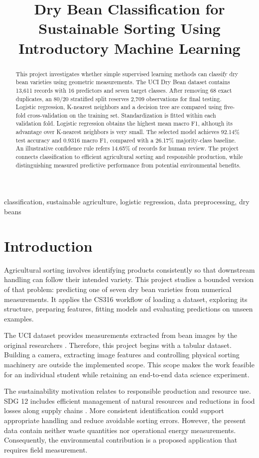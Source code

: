 \documentclass[conference]{IEEEtran}
\title{Dry Bean Classification for Sustainable Sorting Using Introductory Machine Learning}
\author{\IEEEauthorblockN{Abdulrahman Alfawaz}\IEEEauthorblockA{Prince Sultan University\\CS316: Introduction to AI and Data Science, Term 261}}
\begin{document}
\maketitle
\begin{abstract}
This project investigates whether simple supervised learning methods can classify dry bean varieties using geometric measurements. The UCI Dry Bean dataset contains 13,611 records with 16 predictors and seven target classes. After removing 68 exact duplicates, an 80/20 stratified split reserves 2,709 observations for final testing. Logistic regression, K-nearest neighbors and a decision tree are compared using five-fold cross-validation on the training set. Standardization is fitted within each validation fold. Logistic regression obtains the highest mean macro F1, although its advantage over K-nearest neighbors is very small. The selected model achieves 92.14\% test accuracy and 0.9316 macro F1, compared with a 26.17\% majority-class baseline. An illustrative confidence rule refers 14.65\% of records for human review. The project connects classification to efficient agricultural sorting and responsible production, while distinguishing measured predictive performance from potential environmental benefits.\end{abstract}
\begin{IEEEkeywords}classification, sustainable agriculture, logistic regression, data preprocessing, dry beans\end{IEEEkeywords}
\section{Introduction}
Agricultural sorting involves identifying products consistently so that downstream handling can follow their intended variety. This project studies a bounded version of that problem: predicting one of seven dry bean varieties from numerical measurements. It applies the CS316 workflow of loading a dataset, exploring its structure, preparing features, fitting models and evaluating predictions on unseen examples.

The UCI dataset provides measurements extracted from bean images by the original researchers \cite{uci}. Therefore, this project begins with a tabular dataset. Building a camera, extracting image features and controlling physical sorting machinery are outside the implemented scope. This scope makes the work feasible for an individual student while retaining an end-to-end data science experiment.

The sustainability motivation relates to responsible production and resource use. SDG 12 includes efficient management of natural resources and reductions in food losses along supply chains \cite{sdg}. More consistent identification could support appropriate handling and reduce avoidable sorting errors. However, the present data contain neither waste quantities nor operational energy measurements. Consequently, the environmental contribution is a proposed application that requires field measurement.
\end{document}
